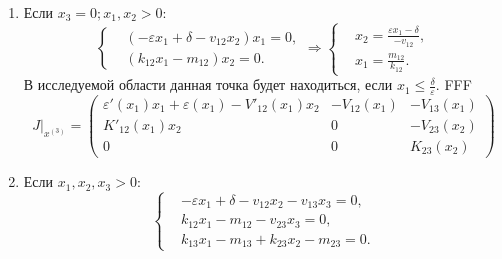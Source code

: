 \begin{enumerate}
\[\begin{matrix}
                        0 & K_{12}(x_1) - V'_{23} (0) x_3 & 0 \\
                        K'_{13} (x_1) x_3 & K'_{23} (0) x_3 & K_{23} (0)
                    \end{matrix}
                \right)
            \]
        \item Если \( x_3 = 0; x_1, x_2 > 0 \):
            \[
                \left\{\begin{split}
                    & \left( -\varepsilon x_1 + \delta - v_{12} x_2 \right)x_1 = 0, \\
                    & ( k_{12} x_1 -m _{12} ) x_2 = 0. 
                \end{split}\right.
                \Rightarrow
                \left\{\begin{split}
                    & x_2 = \frac{ \varepsilon x_1 - \delta }{ -v_{12} }, \\
                    & x_1 = \frac{m_{12}}{k_{12}}. 
                \end{split}\right.
            \]
            В исследуемой области данная точка будет находиться, если \( x_1 \leq \frac{\delta}{\varepsilon}  \). FFF
            \[
                J\big|_{x^{(3)}} = \left(
                    \begin{matrix}
                        \varepsilon'(x_1) x_1 + \varepsilon(x_1) - V'_{12}(x_1) x_2 & -V_{12} (x_1) & -V_{13} (x_1) \\
                        K'_{12} (x_1) x_2 & 0 & -V_{23}(x_2) \\
                        0 & 0 & K_{23} (x_2)
                    \end{matrix}
                \right)
            \]
        \item Если \( x_1, x_2, x_3 > 0 \):
            \[
                \left\{\begin{split}
                    & -\varepsilon x_1 + \delta - v_{12} x_2 - v_{13} x_3 = 0, \\
                    & k_{12} x_1 - m_{12} - v_{23} x_3 = 0, \\
                    & k_{13} x_1 - m_{13} + k_{23} x_2 - m_{23} = 0. 
                \end{split}\right.
            \]

    \end{enumerate}